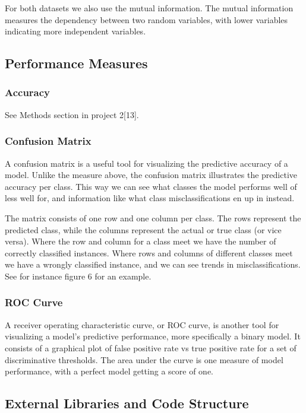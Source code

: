 \documentclass[11pt]{article}
\begin{document}
For both datasets we also use the mutual information. The mutual information measures the dependency between two random variables, with lower variables indicating more independent variables.


    \hypertarget{performance-measures}{%
\subsection{Performance Measures}\label{performance-measures}}

\hypertarget{accuracy}{%
\subsubsection{Accuracy}\label{accuracy}}
See Methods section in project 2[13].
\hypertarget{confusion-matrix}{%
\subsubsection{Confusion Matrix}\label{confusion-matrix}}
A confusion matrix is a useful tool for visualizing the predictive accuracy of a model. Unlike the measure above, the confusion matrix illustrates the predictive accuracy per class. This way we can see what classes the model performs well of less well for, and information like what class misclassifications en up in instead.

The matrix consists of one row and one column per class. The rows represent the predicted class, while the columns represent the actual or true class (or vice versa). Where the row and column for a class meet we have the number of correctly classified instances. Where rows and columns of different classes meet we have a wrongly classified instance, and we can see trends in misclassifications. See for instance figure 6 for an example. 

\hypertarget{roc-curve}{%
\subsubsection{ROC Curve}\label{roc-curve}}
A receiver operating characteristic curve, or ROC curve, is another tool for visualizing a model's predictive performance, more specifically a binary model. It consists of a graphical plot of false positive rate vs true positive rate for a set of discriminative thresholds. The area under the curve is one measure of model performance, with a perfect model getting a score of one.

\hypertarget{ext-lib}{%
	\subsection{External Libraries and Code Structure}\label{ext-lib}}
\end{document}
